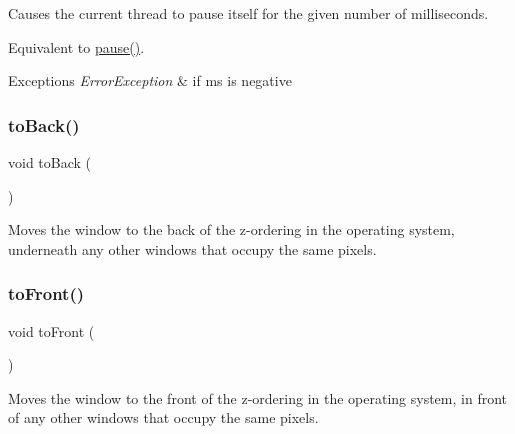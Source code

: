 Causes the current thread to pause itself for the given number of milliseconds. 

Equivalent to \mbox{\hyperlink{classsgl_1_1GWindow_adc7d99bb2dc43b8337e89b7d54cab9d3}{pause()}}. 
\begin{DoxyExceptions}{Exceptions}
{\em Error\+Exception} & if ms is negative \\
\hline
\end{DoxyExceptions}
\mbox{\label{classsgl_1_1GWindow_a6053c984b166df7d3db5ee4c4ad65b99}} 
\subsubsection{\texorpdfstring{to\+Back()}{toBack()}}
{\footnotesize\ttfamily void to\+Back (\begin{DoxyParamCaption}{ }\end{DoxyParamCaption})\hspace{0.3cm}{\ttfamily [virtual]}}



Moves the window to the back of the z-\/ordering in the operating system, underneath any other windows that occupy the same pixels. 

\mbox{\label{classsgl_1_1GWindow_a48a9c646659814220ac869bbcb60b52c}} 
\subsubsection{\texorpdfstring{to\+Front()}{toFront()}}
{\footnotesize\ttfamily void to\+Front (\begin{DoxyParamCaption}{ }\end{DoxyParamCaption})\hspace{0.3cm}{\ttfamily [virtual]}}



Moves the window to the front of the z-\/ordering in the operating system, in front of any other windows that occupy the same pixels. 

\mbox{\label{classsgl_1_1GObservable_a1fe5121d6528fdea3f243321b3fa3a49}} 
